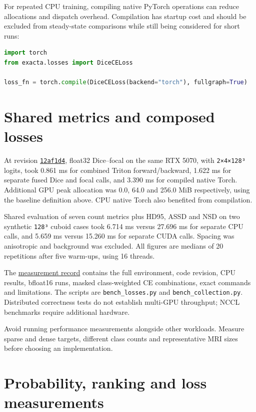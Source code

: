 For repeated CPU training, compiling native PyTorch operations can reduce allocations and
dispatch overhead. Compilation has startup cost and should be excluded from steady-state
comparisons while still being considered for short runs:

\begin{lstlisting}[language=Python]
import torch
from exacta.losses import DiceCELoss

loss_fn = torch.compile(DiceCELoss(backend="torch"), fullgraph=True)
\end{lstlisting}

\section{Shared metrics and composed losses}\label{performance:shared-metrics-and-composed-losses}

At revision \href{https://github.com/rodolfo-viana/exacta/commit/12af1d4762ef03b5724b2603ca26f80051bf9f75}{\texttt{12af1d4}},
float32 Dice--focal on the same RTX 5070, with \texttt{2×4×128³} logits, took 0.861 ms for combined
Triton forward/backward, 1.622 ms for separate fused Dice and focal calls, and 3.390 ms for
compiled native Torch. Additional GPU peak allocation was 0.0, 64.0 and 256.0 MiB respectively,
using the baseline definition above. CPU native Torch also benefited from compilation.

Shared evaluation of seven count metrics plus HD95, ASSD and NSD on two synthetic \texttt{128³}
cuboid cases took 6.714 ms versus 27.696 ms for separate CPU calls, and 5.659 ms versus
15.260 ms for separate CUDA calls. Spacing was anisotropic and background was excluded.
All figures are medians of 20 repetitions after five warm-ups, using 16 threads.

The \href{https://github.com/rodolfo-viana/exacta/blob/v0.0.1a3/benchmarks/results/composition-collection-2026-10-24.md}{measurement record}
contains the full environment, code revision, CPU results, bfloat16 runs, masked class-weighted
CE combinations, exact commands and limitations. The scripts are \texttt{bench\_losses.py} and
\texttt{bench\_collection.py}. Distributed correctness tests do not establish multi-GPU throughput;
NCCL benchmarks require additional hardware.

Avoid running performance measurements alongside other workloads. Measure sparse and dense
targets, different class counts and representative MRI sizes before choosing an implementation.

\section{Probability, ranking and loss measurements}\label{performance:probability-ranking-and-loss-measurements}

